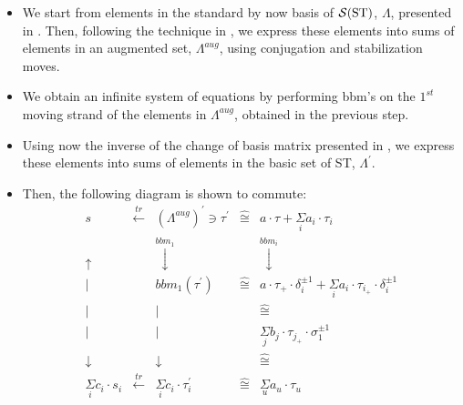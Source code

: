 \documentclass[11pt]{amsart}
\begin{document}
\begin{itemize}
\item[$\bullet$] We start from elements in the standard by now basis of $\mathcal{S}({\rm ST})$, $\Lambda$, presented in \cite{HK}. Then, following the technique in \cite{DL2}, we express these elements into sums of elements in an augmented set, $\Lambda^{aug}$, using conjugation and stabilization moves.
\item[$\bullet$] We obtain an infinite system of equations by performing bbm's on the $1^{st}$ moving strand of the elements in $\Lambda^{aug}$, obtained in the previous step.
\item[$\bullet$] Using now the inverse of the change of basis matrix presented in \cite{DL2}, we express these elements into sums of elements in the basic set of ST, $\Lambda^{\prime}$.
\item[$\bullet$] Then, the following diagram is shown to commute:
\[
\begin{array}{ccccc}
s & \overset{tr}{\longleftarrow} & \left({\Lambda^{aug}}\right)^{\prime} \ni \tau^{\prime} & {\widehat{\cong}} & a\cdot \tau + \underset{i}{\Sigma} a_i\cdot \tau_i \\
\uparrow  &                              & \overset{bbm_1}{\downarrow}                &                   & \overset{bbm_i}{\downarrow} \\
|	&                              &  bbm_1(\tau^{\prime})                      & {\widehat{\cong}} &  a\cdot \tau_+\cdot \delta_i^{\pm 1} + \underset{i}{\Sigma} a_i\cdot \tau_{i_+}\cdot \delta_i^{\pm 1}\\
|	&                              &                  |                          &                   & {\widehat{\cong}} \\
|	&                              &                |                  &                   &  \underset{j}{\Sigma} b_j\cdot \tau_{j_+}\cdot \sigma_1^{\pm 1}  \\
	
\downarrow  &                              &             \downarrow                               &                   & {\widehat{\cong}} \\
	\underset{i}{\Sigma} c_i\cdot s_i & \overset{tr}{\longleftarrow} & \underset{i}{\Sigma} c_i\cdot \tau_i^{\prime} & {\widehat{\cong}} & \underset{u}{\Sigma} a_u \cdot \tau_u \\
\end{array}
\]


\end{itemize}
\end{document}
